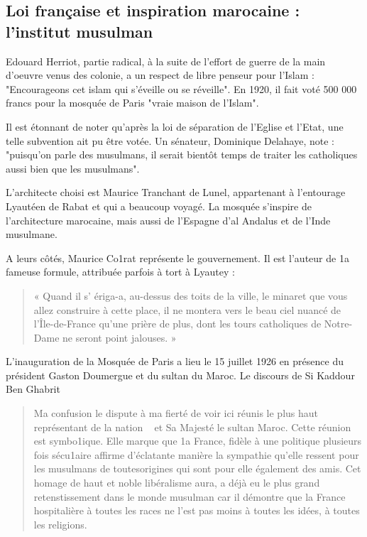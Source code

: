 \subsection{Loi française et inspiration marocaine : l'institut musulman}
Edouard Herriot, partie radical, à la suite de l'effort de guerre de la main d'oeuvre venus des colonie, a un respect de libre penseur pour l'Islam : "Encourageons cet islam qui s'éveille ou se réveille". En 1920, il fait voté 500 000 francs pour la mosquée de Paris "vraie maison de l'Islam".

Il est étonnant de noter qu'après la loi de séparation de l'Eglise et l'Etat, une telle subvention ait pu être votée. Un sénateur, Dominique Delahaye, note : "puisqu'on parle des musulmans, il serait bientôt temps de traiter les catholiques aussi bien que les musulmans".

L'architecte choisi est Maurice Tranchant de Lunel, appartenant à l'entourage Lyautéen de Rabat et qui a beaucoup voyagé. La mosquée s'inspire de l'architecture marocaine, mais aussi de l'Espagne d'al Andalus et de l'Inde musulmane. 

A leurs côtés,
Maurice Co1rat représente le gouvernement. Il est l'auteur de
1a fameuse formule, attribuée parfois à tort à Lyautey :
\begin{quote}
    « Quand
il s' ériga-a, au-dessus des toits de la ville, le minaret que vous
allez construire à cette place, il ne montera vers le beau ciel
nuancé de l'Île-de-France qu'une prière de plus, dont les tours
catholiques de Notre-Dame ne seront point jalouses. »
\end{quote}

L'inauguration de la Mosquée de Paris a lieu le 15 juillet 1926 en présence du président Gaston Doumergue et du sultan du Maroc. Le discours de Si Kaddour Ben Ghabrit 
\begin{quote}
    
Ma confusion le dispute à
ma fierté de voir ici réunis le plus haut représentant de la nation
~ et Sa Majesté le sultan Maroc. Cette réunion est symbo1ique. Elle marque que 1a France, fidèle à une politique plusieurs
fois sécu1aire affirme d'éclatante manière la sympathie qu'elle ressent pour les musulmans de toutesorigines qui sont pour elle également des amis. Cet homage de haut et noble libéralisme aura, a déjà eu le plus grand retenstissement dans le monde musulman car il démontre que la France hospitalière à toutes les races ne l'est pas moins à toutes les idées, à toutes les religions. \end{quote}

